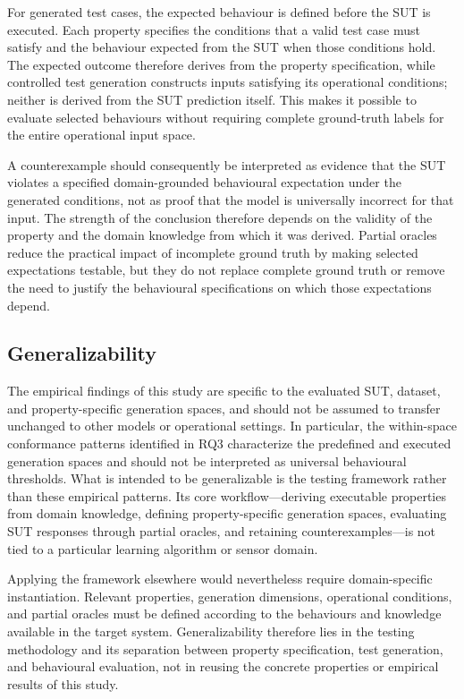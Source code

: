 \documentclass[preprint,12pt]{elsarticle}
\begin{document}
For generated test cases, the expected behaviour is defined before the SUT
is executed. Each property specifies the conditions that a valid test case
must satisfy and the behaviour expected from the SUT when those conditions
hold. The expected outcome therefore derives from the property specification,
while controlled test generation constructs inputs satisfying its operational
conditions; neither is derived from the SUT prediction itself. This makes it
possible to evaluate selected behaviours without requiring complete
ground-truth labels for the entire operational input space.

A counterexample should consequently be interpreted as evidence that the
SUT violates a specified domain-grounded behavioural expectation under the
generated conditions, not as proof that the model is universally incorrect
for that input. The strength of the conclusion therefore depends on the
validity of the property and the domain knowledge from which it was derived.
Partial oracles reduce the practical impact of incomplete ground truth by
making selected expectations testable, but they do not replace complete
ground truth or remove the need to justify the behavioural specifications
on which those expectations depend.

\subsection{Generalizability}
\label{sec:discussion_generalizability}

The empirical findings of this study are specific to the evaluated SUT,
dataset, and property-specific generation spaces, and should not be assumed
to transfer unchanged to other models or operational settings. In
particular, the within-space conformance patterns identified in RQ3
characterize the predefined and executed generation spaces and should not
be interpreted as universal behavioural thresholds. What is intended to be
generalizable is the testing framework rather than these empirical patterns.
Its core workflow---deriving executable properties from domain knowledge,
defining property-specific generation spaces, evaluating SUT responses
through partial oracles, and retaining counterexamples---is not tied to a
particular learning algorithm or sensor domain.

Applying the framework elsewhere would nevertheless require
domain-specific instantiation. Relevant properties, generation dimensions,
operational conditions, and partial oracles must be defined according to the
behaviours and knowledge available in the target system. Generalizability
therefore lies in the testing methodology and its separation between
property specification, test generation, and behavioural evaluation, not
in reusing the concrete properties or empirical results of this study.
\end{document}
